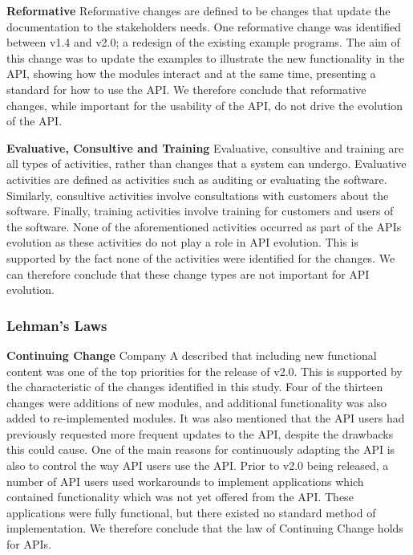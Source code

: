 \documentclass{sig-alternate}
\begin{document}
\smallskip \noindent
\textbf{Reformative  }
Reformative changes are defined to be changes that update the documentation to the stakeholders needs.
One reformative change was identified between v1.4 and v2.0; a redesign of the existing example programs. The aim of this change was to update the examples to illustrate the new functionality in the API, showing how the modules interact and at the same time, presenting a standard for how to use the API.
We therefore conclude that reformative changes, while important for the usability of the API, do not drive the evolution of the API.

\smallskip \noindent
\textbf{Evaluative, Consultive and Training  }
Evaluative, consultive and training are all types of activities, rather than changes that a system can undergo. Evaluative activities are defined as activities such as auditing or evaluating the software. Similarly, consultive activities involve consultations with customers about the software. Finally, training activities involve training for customers and users of the software.
None of the aforementioned activities occurred as part of the APIs evolution as these activities do not play a role in API evolution. This is supported by the fact none of the activities were identified for the changes.
We can therefore conclude that these change types are not important for API evolution.


\subsubsection{Lehman's Laws} 

\smallskip \noindent
\textbf{Continuing Change  } 
Company A described that including new functional content was one of the top priorities for the release of v2.0. This is supported by the characteristic of the changes identified in this study. Four of the thirteen changes were additions of new modules, and additional functionality was also added to re-implemented modules. It was also mentioned that the API users had previously requested more frequent updates to the API, despite the drawbacks this could cause. One of the main reasons for continuously adapting the API is also to control the way API users use the API. Prior to v2.0 being released, a number of API users used workarounds to implement applications which contained functionality which was not yet offered from the API. These applications were fully functional, but there existed no standard method of implementation. We therefore conclude that the law of Continuing Change holds for APIs. 
\end{document}
